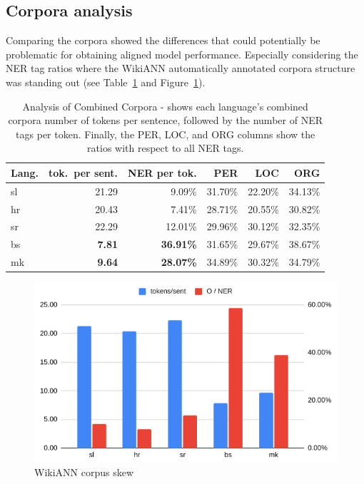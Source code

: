 \documentclass[sigconf]{acmart}
\begin{document}
\subsection{Corpora analysis}
\label{subsec:corpora-analysis}
Comparing the corpora showed the differences that could potentially be problematic for obtaining aligned model performance.
Especially considering the NER tag ratios where the WikiANN automatically annotated corpora structure was standing out (see Table~\ref{tab:corpora_analysis} and Figure~\ref{fig:corpora_analysis}).
\begin{table}[H]
  \caption{Analysis of Combined Corpora - shows each language's combined corpora number of tokens per sentence, followed by the number of NER tags per token. Finally, the PER, LOC, and ORG columns show the ratios with respect to all NER tags.}
  \label{tab:corpora_analysis}
  \begin{tabular}{lrrrrr}
    \toprule
    Lang.&tok.\ per sent.&NER per tok.&PER&LOC&ORG\\
    \midrule
    sl&21.29&9.09\%&31.70\%&22.20\%&34.13\%\\
    hr&20.43&7.41\%&28.71\%&20.55\%&30.82\%\\
    sr&22.29&12.01\%&29.96\%&30.12\%&32.35\%\\
    bs&\textbf{7.81}&\textbf{36.91\%}&31.65\%&29.67\%&38.67\%\\
    mk&\textbf{9.64}&\textbf{28.07\%}&34.89\%&30.32\%&34.79\%\\
    \bottomrule
  \end{tabular}
\end{table}

\begin{figure}[h]
  \centering
  \includegraphics[width=\linewidth]{wikiann-skew}
  \caption{WikiANN corpus skew}
  \label{fig:corpora_analysis}
\end{figure}
\end{document}
